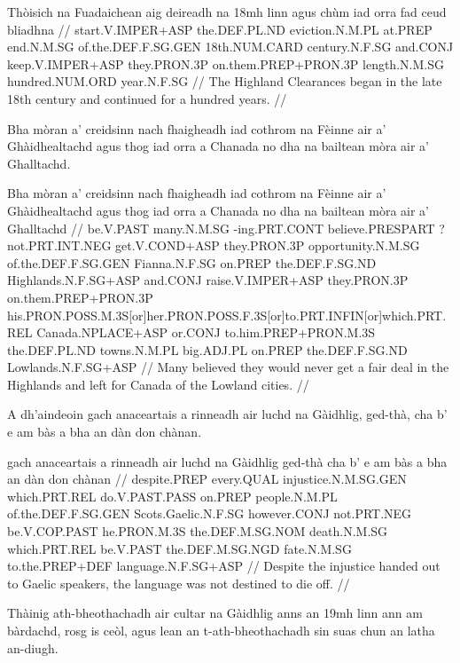 \documentclass[a4paper,10pt]{article}
\begin{document}
\vspace{4mm}
\gla Thòisich na Fuadaichean aig deireadh na 18mh linn agus chùm iad orra fad ceud bliadhna  //
\glb start.V.IMPER+ASP the.DEF.PL.ND eviction.N.M.PL at.PREP end.N.M.SG of.the.DEF.F.SG.GEN 18th.NUM.CARD century.N.F.SG and.CONJ keep.V.IMPER+ASP they.PRON.3P on.them.PREP+PRON.3P length.N.M.SG hundred.NUM.ORD year.N.F.SG  //
\glft The Highland Clearances began in the late 18th century and continued for a hundred years. //
\endgl
\xe

\ex
\begingl
\glpre Bha mòran a' creidsinn nach fhaigheadh iad cothrom na Fèinne air a' Ghàidhealtachd agus thog iad orra a Chanada no dha na bailtean mòra air a' Ghalltachd. 

\vspace{4mm}
\gla Bha mòran a' creidsinn nach fhaigheadh iad cothrom na Fèinne air a' Ghàidhealtachd agus thog iad orra a Chanada no dha na bailtean mòra air a' Ghalltachd  //
\glb be.V.PAST many.N.M.SG -ing.PRT.CONT believe.PRESPART ?not.PRT.INT.NEG get.V.COND+ASP they.PRON.3P opportunity.N.M.SG of.the.DEF.F.SG.GEN Fianna.N.F.SG on.PREP the.DEF.F.SG.ND Highlands.N.F.SG+ASP and.CONJ raise.V.IMPER+ASP they.PRON.3P on.them.PREP+PRON.3P his.PRON.POSS.M.3S[or]her.PRON.POSS.F.3S[or]to.PRT.INFIN[or]which.PRT.REL Canada.NPLACE+ASP or.CONJ to.him.PREP+PRON.M.3S the.DEF.PL.ND towns.N.M.PL big.ADJ.PL on.PREP the.DEF.F.SG.ND Lowlands.N.F.SG+ASP  //
\glft Many believed they would never get a fair deal in the Highlands and left for Canada of the Lowland cities. //
\endgl
\xe

\ex
\begingl
\glpre A dh'aindeoin gach anaceartais a rinneadh air luchd na Gàidhlig, ged-thà, cha b' e am bàs a bha an dàn don chànan. 

\vspace{4mm}
 gach anaceartais a rinneadh air luchd na Gàidhlig ged-thà cha b' e am bàs a bha an dàn don chànan  //
\glb despite.PREP every.QUAL injustice.N.M.SG.GEN which.PRT.REL do.V.PAST.PASS on.PREP people.N.M.PL of.the.DEF.F.SG.GEN Scots.Gaelic.N.F.SG however.CONJ not.PRT.NEG be.V.COP.PAST he.PRON.M.3S the.DEF.M.SG.NOM death.N.M.SG which.PRT.REL be.V.PAST the.DEF.M.SG.NGD fate.N.M.SG to.the.PREP+DEF language.N.F.SG+ASP  //
\glft Despite the injustice handed out to Gaelic speakers, the language was not destined to die off. //
\endgl
\xe

\ex
\begingl
\glpre Thàinig ath-bheothachadh air cultar na Gàidhlig anns an 19mh linn ann am bàrdachd, rosg is ceòl, agus lean an t-ath-bheothachadh sin suas chun an latha an-diugh. 
\end{document}
